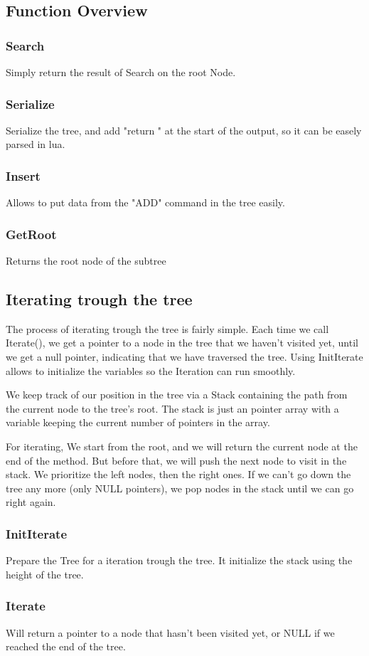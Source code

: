 \documentclass[10pt]{article}
\begin{document}
\subsection{Function Overview}
\subsubsection*{Search}
Simply return the result of Search on the root Node.

\subsubsection*{Serialize}
Serialize the tree, and add "return " at the start of the output, so it can be easely parsed in lua.

\subsubsection*{Insert}
Allows to put data from the "ADD" command in the tree easily.

\subsubsection*{GetRoot}
Returns the root node of the subtree

\subsection{Iterating trough the tree}
The process of iterating trough the tree is fairly simple. Each time we call Iterate(), we get a pointer to a node in the tree that we haven’t visited yet, until we get a null pointer, indicating that we have traversed the tree. Using InitIterate allows to initialize the variables so the Iteration can run smoothly.

We keep track of our position in the tree via a Stack containing the path from the current node to the tree's root. The stack is just an pointer array with a variable keeping the current number of pointers in the array.

For iterating, We start from the root, and we will return the current node at the end of the method. But before that, we will push the next node to visit in the stack. We prioritize the left nodes, then the right ones. If we can't go down the tree any more (only NULL pointers), we pop nodes in the stack until we can go right again.

\subsubsection*{InitIterate}
Prepare the Tree for a iteration trough the tree. It initialize the stack using the height of the tree.

\subsubsection*{Iterate}
Will return a pointer to a node that hasn't been visited yet, or NULL if we reached the end of the tree.
 
\end{document}
